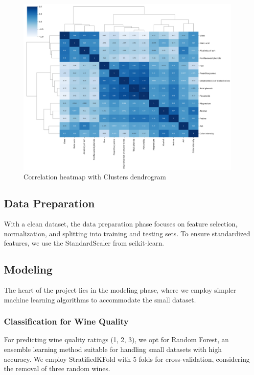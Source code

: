 \documentclass[twocolumn]{article}
\begin{document}
	\begin{figure}[H]
		\centering
		\includegraphics[width=1\linewidth]{Cluster Heatmap.png}
		\caption{Correlation heatmap with Clusters dendrogram}
		\label{fig:cluster-heatmap}
	\end{figure}

	\subsection{Data Preparation}
	With a clean dataset, the data preparation phase focuses on feature selection,
	normalization, and splitting into training and testing sets. To ensure standardized
	features, we use the StandardScaler from scikit-learn.

	\subsection{Modeling}
	The heart of the project lies in the modeling phase, where we employ simpler machine
	learning algorithms to accommodate the small dataset.

	\subsubsection{Classification for Wine Quality}
	For predicting wine quality ratings (1, 2, 3), we opt for Random Forest, an ensemble
	learning method suitable for handling small datasets with high accuracy. We
	employ StratifiedKFold with 5 folds for cross-validation, considering the removal
	of three random wines.
\end{document}
